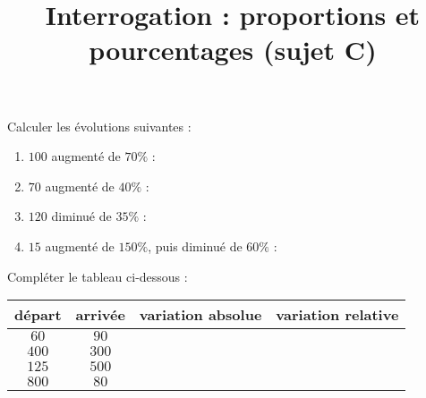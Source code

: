 \documentclass[
	classe=$2^{de}$,
	landscape,
	twocolumn,
	headerTitle={Interrogation 15 min.}
]{évaluation}
\begin{document}
\begin{exercice}
	Calculer les évolutions suivantes :
	\begin{enumerate}
		\item $100$ augmenté de $70\%$ : 
		\item $70$ augmenté de $40\%$ : 
		\item $120$ diminué de $35\%$ : 
		\item $15$ augmenté de $150\%$, puis diminué de $60\%$ : 
	\end{enumerate}
\end{exercice}

\begin{exercice}
	Compléter le tableau ci-dessous :
	\begin{center}
		\begin{tabular}{|c|c|c|c|}
			\hline
			départ & arrivée & variation absolue   & variation relative   \\ \hline
			$60$   & $90$    & \correction{$30$}   & \correction{$0,5$}   \\ \hline
			$400$  & $300$   & \correction{$-200$} & \correction{$-0,25$} \\ \hline
			$125$  & $500$   & \correction{$375$}  & \correction{$3$}     \\ \hline
			$800$  & $80$    & \correction{$-720$} & \correction{$-0,9$}  \\ \hline
		\end{tabular}
	\end{center}
\end{exercice}

\setcounter{exercice}{1}
\newpage

\title{Interrogation : proportions et pourcentages (sujet C)}
\maketitle
\end{document}
